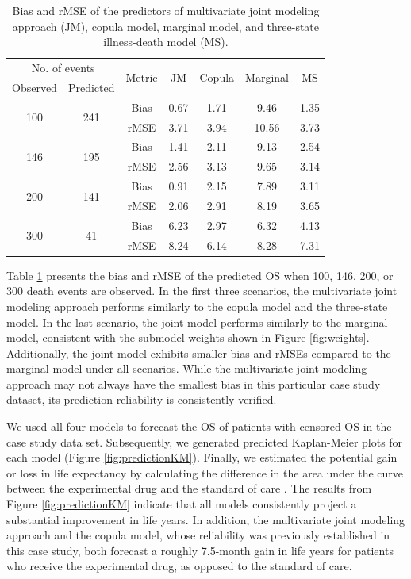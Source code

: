\begin{table}
\caption{Bias and \ac{rMSE} of the predictors of multivariate joint modeling approach (JM), copula model, marginal model, and three-state illness-death model (MS). \label{tab:casestudytable}}
\begin{center}
\begin{tabular}{ccccccc}
\hline
\multicolumn{2}{c}{No. of events} & \multirow{2}{*}{Metric} & \multirow{2}{*}{JM} & \multirow{2}{*}{Copula} & \multirow{2}{*}{Marginal} & \multirow{2}{*}{MS}\\ 
Observed & Predicted & & & & & \\\hline
\multirow{2}{*}{100} & \multirow{2}{*}{241} & Bias & 0.67 & 1.71 & 9.46 & 1.35\\
&& rMSE & 3.71 & 3.94 & 10.56 & 3.73 \\ \hline
\multirow{2}{*}{146} & \multirow{2}{*}{195} & Bias & 1.41 & 2.11 & 9.13 & 2.54\\
&& rMSE & 2.56 & 3.13 & 9.65 & 3.14 \\ \hline
\multirow{2}{*}{200} & \multirow{2}{*}{141} & Bias & 0.91 & 2.15 & 7.89 & 3.11\\
&& rMSE & 2.06 & 2.91 & 8.19 & 3.65 \\ \hline
\multirow{2}{*}{300} & \multirow{2}{*}{41} & Bias & 6.23 & 2.97 & 6.32 & 4.13  \\
&& rMSE & 8.24 & 6.14 & 8.28 & 7.31  \\ \hline
\end{tabular}
\end{center}
\end{table}

Table \ref{tab:casestudytable} presents the bias and \ac{rMSE} of the predicted \ac{OS} when 100, 146, 200, or 300 death events are observed. In the first three scenarios, the multivariate joint modeling approach performs similarly to the copula model and the three-state model. In the last scenario, the joint model performs similarly to the marginal model, consistent with the submodel weights shown in Figure \ref{fig:weights}. Additionally, the joint model exhibits smaller bias and rMSEs compared to the marginal model under all scenarios. While the multivariate joint modeling approach may not always have the smallest bias in this particular case study dataset, its prediction reliability is consistently verified. 

We used all four models to forecast the \ac{OS} of patients with censored \ac{OS} in the case study data set. Subsequently, we generated predicted Kaplan-Meier plots for each model (Figure \ref{fig:predictionKM}). Finally, we estimated the potential gain or loss in life expectancy by calculating the difference in the area under the curve between the experimental drug and the standard of care \citep{pak2017interpretability, survRM2}. The results from Figure \ref{fig:predictionKM} indicate that all models consistently project a substantial improvement in life years. In addition, the multivariate joint modeling approach and the copula model, whose reliability was previously established in this case study, both forecast a roughly 7.5-month gain in life years for patients who receive the experimental drug, as opposed to the standard of care.


